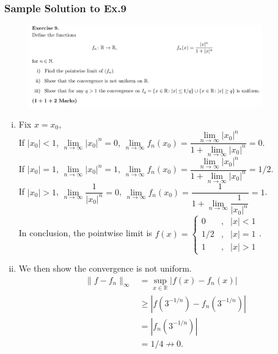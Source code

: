 \documentclass[10pt, t]{beamer}
\newcommand{\R}{\mathbb{R}}
\begin{document}
\begin{frame}[allowframebreaks]
    \frametitle{Sample Solution to Ex.9}

    \begin{figure}[H]
        \centering
        \includegraphics[width=0.9\textwidth]{2020-11-17-21-44-40.png}
    \end{figure}

    \begin{enumerate}[i)]
        \item 
        Fix $x=x_0$,\\
        If $|x_0|<1$, $\underset{n\to\infty}{\lim}|x_0|^n=0$, $\underset{n\to\infty}{\lim}f_n(x_0)=\dfrac{\underset{n\to\infty}{\lim}|x_0|^n}{1+\underset{n\to\infty}{\lim}|x_0|^n}=0$.\\
        If $|x_0|=1$, $\underset{n\to\infty}{\lim}|x_0|^n=1$, $\underset{n\to\infty}{\lim}f_n(x_0)=\dfrac{\underset{n\to\infty}{\lim}|x_0|^n}{1+\underset{n\to\infty}{\lim}|x_0|^n}=1/2$.\\
        If $|x_0|>1$, $\underset{n\to\infty}{\lim}\dfrac{1}{|x_0|^n}=0$, $\underset{n\to\infty}{\lim}f_n(x_0)=\dfrac{1}{1+\underset{n\to\infty}{\lim}\dfrac{1}{|x_0|^n}}=1$.\\[8pt]
        In conclusion, the pointwise limit is $f(x)=\left\{\begin{aligned}
            0 & , & |x|<1 \\
            1/2 & , & |x|=1 \\
            1 & , & |x|>1
            \end{aligned}
            \right.$.
        \item We then show the convergence is not uniform.\\
        \begin{align*}
            \|f-f_n\|_\infty &= \underset{x\in\R}{\sup }|f(x)-f_n(x)|\\
            & \geq |f(3^{-1/n})-f_n(3^{-1/n})|\\
            & = |f_n(3^{-1/n})|\\
            & = 1/4 \nrightarrow 0.
        \end{align*}

\end{enumerate}
\end{frame}
\end{document}
